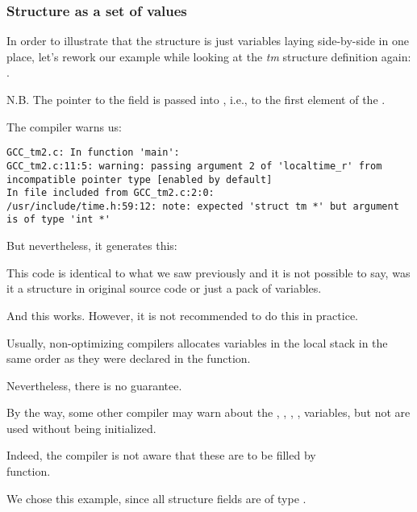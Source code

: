 ﻿\subsubsection{Structure as a set of values}

In order to illustrate that the structure is just variables laying side-by-side in one place, 
let's rework our example while looking at the \emph{tm} structure definition again: .



N.B. 
The pointer to the  field is passed into , i.e., 
to the first element of the .

The compiler warns us:

\begin{lstlisting}[caption=GCC 4.7.3]
GCC_tm2.c: In function 'main':
GCC_tm2.c:11:5: warning: passing argument 2 of 'localtime_r' from incompatible pointer type [enabled by default]
In file included from GCC_tm2.c:2:0:
/usr/include/time.h:59:12: note: expected 'struct tm *' but argument is of type 'int *'
\end{lstlisting}

But nevertheless, it generates this:



This code is identical to what we saw previously and it is
not possible to say, was it a structure in original source code or just a pack of variables.

And this works. 
However, it is not recommended to do this in practice. 

Usually, non-optimizing compilers allocates variables in the local stack in the 
same order as they were declared in the function.

Nevertheless, there is no guarantee.

By the way, some other compiler may warn about the , , ,
,  variables, but not 
 are used without being initialized.

Indeed, the compiler is not aware that these are to be filled by\\
 function.

We chose this example, since all structure fields are of type \Tint.%

